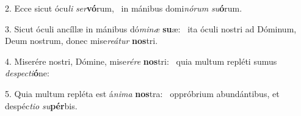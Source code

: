 2. Ecce sicut ócu\textit{li} \textit{ser}\textbf{vó}rum, \ast\  in mánibus domi\textit{nó}\textit{rum} \textit{su}\textbf{ó}rum.\

3. Sicut óculi ancíllæ in mánibus dó\textit{mi}\textit{næ} \textbf{su}æ: \ast\  ita óculi nostri ad Dóminum, Deum nostrum, donec mise\textit{re}\textit{á}\textit{tur} \textbf{nos}tri.\

4. Miserére nostri, Dómine, mise\textit{ré}\textit{re} \textbf{nos}tri: \ast\  quia multum repléti sumus \textit{de}\textit{spec}\textit{ti}\textbf{ó}ne:\

5. Quia multum repléta est á\textit{ni}\textit{ma} \textbf{nos}tra: \ast\  oppróbrium abundántibus, et despéc\textit{ti}\textit{o} \textit{su}\textbf{pér}bis.\

